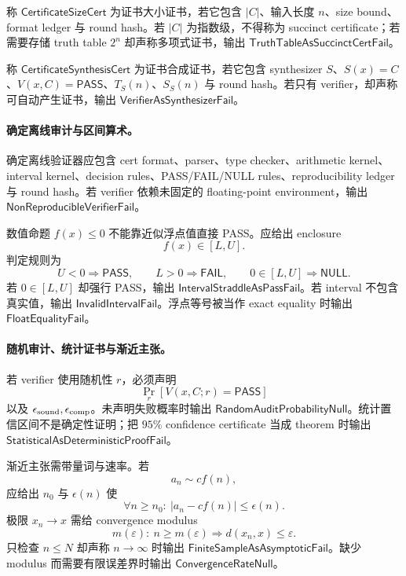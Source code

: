 \begin{definition}[证书大小与合成证书]\label{def:typed-address-biaxial-completion-certificate-size-synthesis-cert}
称 \(\mathsf{CertificateSizeCert}\) 为证书大小证书，若它包含 \(|C|\)、输入长度 \(n\)、size bound、format ledger 与 round hash。若 \(|C|\) 为指数级，不得称为 succinct certificate；若需要存储 truth table \(2^n\) 却声称多项式证书，输出 \(\mathsf{TruthTableAsSuccinctCertFail}\)。

称 \(\mathsf{CertificateSynthesisCert}\) 为证书合成证书，若它包含 synthesizer \(S\)、\(S(x)=C\)、\(V(x,C)=\mathsf{PASS}\)、\(T_S(n)\)、\(S_S(n)\) 与 round hash。若只有 verifier，却声称可自动产生证书，输出 \(\mathsf{VerifierAsSynthesizerFail}\)。
\end{definition}

\paragraph{确定离线审计与区间算术。}
确定离线验证器应包含 cert format、parser、type checker、arithmetic kernel、interval kernel、decision rules、PASS/FAIL/NULL rules、reproducibility ledger 与 round hash。若 verifier 依赖未固定的 floating-point environment，输出 \(\mathsf{NonReproducibleVerifierFail}\)。

数值命题 \(f(x)\le0\) 不能靠近似浮点值直接 PASS。应给出 enclosure
\[
\boxed{f(x)\in[L,U].}
\]
判定规则为
\[
U<0\Rightarrow\mathsf{PASS},\qquad
L>0\Rightarrow\mathsf{FAIL},\qquad
0\in[L,U]\Rightarrow\mathsf{NULL}.
\]
若 \(0\in[L,U]\) 却强行 PASS，输出 \(\mathsf{IntervalStraddleAsPassFail}\)。若 interval 不包含真实值，输出 \(\mathsf{InvalidIntervalFail}\)。浮点等号被当作 exact equality 时输出 \(\mathsf{FloatEqualityFail}\)。

\paragraph{随机审计、统计证书与渐近主张。}
若 verifier 使用随机性 \(r\)，必须声明
\[
\Pr_r[V(x,C;r)=\mathsf{PASS}]
\]
以及 \(\epsilon_{\rm sound},\epsilon_{\rm comp}\)。未声明失败概率时输出 \(\mathsf{RandomAuditProbabilityNull}\)。统计置信区间不是确定性证明；把 \(95\%\) confidence certificate 当成 theorem 时输出 \(\mathsf{StatisticalAsDeterministicProofFail}\)。

渐近主张需带量词与速率。若
\[
a_n\sim c f(n),
\]
应给出 \(n_0\) 与 \(\epsilon(n)\) 使
\[
\boxed{
\forall n\ge n_0:\ |a_n-cf(n)|\le\epsilon(n).
}
\]
极限 \(x_n\to x\) 需给 convergence modulus
\[
\boxed{
m(\varepsilon):\ n\ge m(\varepsilon)\Rightarrow d(x_n,x)\le\varepsilon.
}
\]
只检查 \(n\le N\) 却声称 \(n\to\infty\) 时输出 \(\mathsf{FiniteSampleAsAsymptoticFail}\)。缺少 modulus 而需要有限误差界时输出 \(\mathsf{ConvergenceRateNull}\)。

